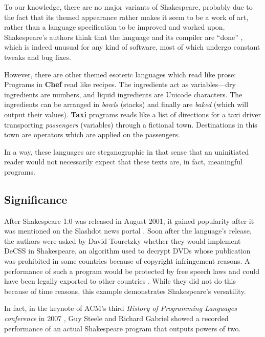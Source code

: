 To our knowledge, there are no major variants of Shakespeare, probably due to the fact that its themed appearance rather makes it seem to be a work of art, rather than a language specification to be improved and worked upon. Shakespeare's authors think that the language and its compiler are “done” \cite{herrick2011az}, which is indeed unusual for any kind of software, most of which undergo constant tweaks and bug fixes.

However, there are other themed esoteric languages which read like prose: Programs in \textbf{Chef} read like recipes. The ingredients act as variables---dry ingredients are numbers, and liquid ingredients are Unicode characters. The ingredients can be arranged in \emph{bowls} (stacks) and finally are \emph{baked} (which will output their values). \textbf{Taxi} programs reads like a list of directions for a taxi driver transporting \emph{passengers} (variables) through a fictional town. Destinations in this town are operators which are applied on the passengers.

In a way, these languages are steganographic in that sense that an uninitiated reader would not necessarily expect that these texts are, in fact, meaningful programs.

\subsection{Significance}

After Shakespeare 1.0 was released in August 2001, it gained popularity after it was mentioned on the Slashdot news portal \cite{tjernlund2001shakespeare}. Soon after the language's release, the authors were asked by David Touretzky whether they would implement DeCSS in Shakespeare, an algorithm used to decrypt DVDs whose publication was prohibited in some countries because of copyright infringement reasons. A performance of such a program would be protected by free speech laws and could have been legally exported to other countries \cite{herrick2011az}. While they did not do this because of time reasons, this example demonstrates Shakespeare's versatility.

In fact, in the keynote of ACM's third \emph{History of Programming Languages conference} in 2007 \cite{chapiewski2007computational}, Guy Steele and Richard Gabriel showed a recorded performance of an actual Shakespeare program that outputs powers of two.
